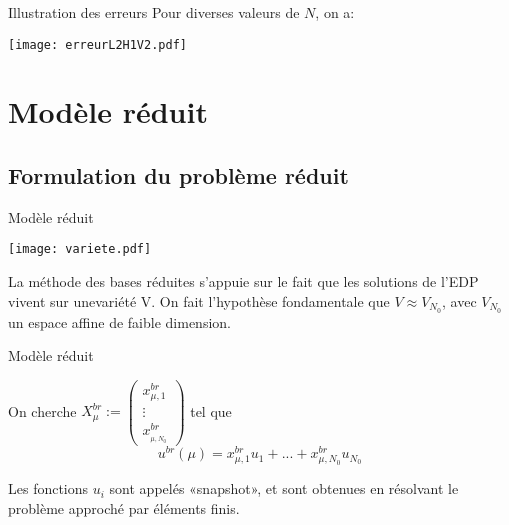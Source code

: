 \documentclass[10pt]{beamer}
\begin{document}
\begin{frame}{Illustration des erreurs}
Pour diverses valeurs de $N $, on a:

\begin{center}
\texttt{[image: erreurL2H1V2.pdf]}
\end{center}

\end{frame}


\begin{comment}
nous avons résolu le problème \eqref{eqnum1} et calculer l'erreur entre $u_{ex}$ et $u_{EF}$ en norme $H^1$ et $L^{2}$. La pente de l'erreur est de $2$ en norme $H^1$ et $L^{2}$, ce qui est conforme aux attentes théoriques.
   
\end{comment}








\section{Modèle réduit}


\subsection{ Formulation du problème réduit }



\begin{frame}{Modèle réduit}

\texttt{[image: variete.pdf]}

\noindent La méthode des bases réduites s’appuie sur le fait que les solutions de l’EDP vivent sur unevariété V.
On fait l'hypothèse fondamentale que $V \approx V_{N_{0}}$, avec $V_{N_{0}}$ un espace affine de faible dimension. 
 
\end{frame}

\begin{frame}{Modèle réduit}


On cherche $
X^{br}_{\mu} :=
\begin{pmatrix}
x^{br}_{\mu,1}\\
\vdots \\ 
x^{br}__{\mu,N_{0}}
\end{pmatrix}
$
 tel que $$ u^{br}(\mu) = x^{br}_{\mu,1}u_1 + ... + x^{br}_{\mu,N_{0}}u_{N_{0}}$$

\noindent Les fonctions $u_i$ sont appelés «snapshot», et sont obtenues en résolvant le problème approché par éléments finis.
 
\end{frame}
\end{document}
